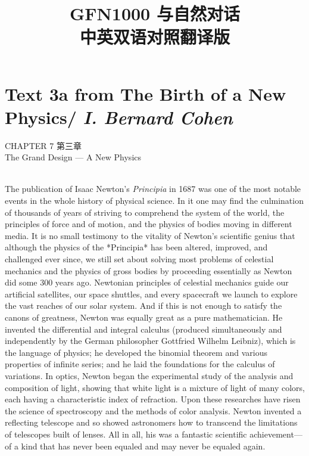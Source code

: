 \documentclass{article}
\begin{document}
\title{\textbf{
GFN1000 与自然对话\\
中英双语对照翻译版
}} %
\date{}
\maketitle %

\setcounter{secnumdepth}{0} %
\tableofcontents
\newpage
\section{Text 3a from The Birth of a New Physics/ \textit{I. Bernard Cohen}}
\begin{center}
CHAPTER 7 第三章\\
The Grand Design — A New Physics\\
\end{center}
\\
The publication of Isaac Newton’s \textit{Principia} in 1687 was one of the most notable events in the whole history of physical science. In it one may find the culmination of thousands of years of striving to comprehend the system of the world, the principles of force and of motion, and the physics of bodies moving in different media. It is no small testimony to the vitality of Newton’s scientific genius that although the physics of the *Principia* has been altered, improved, and challenged ever since, we still set about solving most problems of celestial mechanics and the physics of gross bodies by proceeding essentially as Newton did some 300 years ago. Newtonian principles of celestial mechanics guide our artificial satellites, our space shuttles, and every spacecraft we launch to explore the vast reaches of our solar system. And if this is not enough to satisfy the canons of greatness, Newton was equally great as a pure mathematician. He invented the differential and integral calculus (produced simultaneously and independently by the German philosopher Gottfried Wilhelm Leibniz), which is the language of physics; he developed the binomial theorem and various properties of infinite series; and he laid the foundations for the calculus of variations. In optics, Newton began the experimental study of the analysis and composition of light, showing that white light is a mixture of light of many colors, each having a characteristic index of refraction. Upon these researches have risen the science of spectroscopy and the methods of color analysis. Newton invented a reflecting telescope and so showed astronomers how to transcend the limitations of telescopes built of lenses. All in all, his was a fantastic scientific achievement—of a kind that has never been equaled and may never be equaled again.\\
\end{document}
